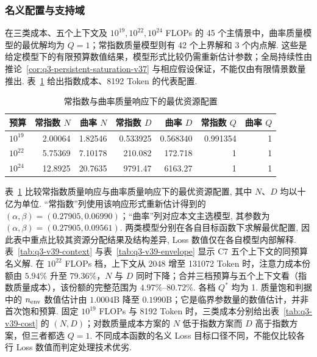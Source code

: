 \subsubsection{名义配置与支持域}
在三类成本、五个上下文及 $10^{19},10^{22},10^{24}$ FLOPs 的 45 个主情景中，曲率质量模型的最优解均为 $Q=1$；常指数质量模型则有 42 个上界解和 3 个内点解. 这些是给定模型下的有限预算数值结果，模型形式比较仍需重新估计参数；全局持续性由推论~\ref{cor:q3-persistent-saturation-v37} 与相应假设保证，不能仅由有限情景数量推出. 表~\ref{tab:q3-v26-config} 给出指数成本、8192 Token 的代表配置. 
\begin{table}[htbp]\centering\small
    \caption{常指数与曲率质量响应下的最优资源配置}\label{tab:q3-v26-config}
    \begin{tabular}{lrrrrrr}\toprule
        预算        & 常指数 $N$ & 曲率 $N$  & 常指数 $D$  & 曲率 $D$   & 常指数 $Q$  & 曲率 $Q$ \\\midrule
        $10^{19}$ & 2.00064 & 1.82546 & 0.533925 & 0.568340 & 0.991354 & 1      \\
        $10^{22}$ & 5.75369 & 7.10178 & 210.082  & 172.718  & 1        & 1      \\
        $10^{24}$ & 12.8925 & 20.7635 & 9791.47  & 6163.27  & 1        & 1      \\\bottomrule
    \end{tabular}\end{table}




表~\ref{tab:q3-v26-config} 比较常指数质量响应与曲率质量响应下的最优资源配置, 其中 $N$、$D$ 均以十亿为单位. “常指数”列使用该响应形式重新估计得到的 $(\alpha,\beta)=(0.27905,0.06990)$；“曲率”列对应本文主选模型, 其参数为 $(\alpha,\beta)=(0.27905,0.09561)$. 两类模型分别在各自目标函数下求解最优配置, 因此表中重点比较其资源分配结果及结构差异, Loss 数值仅在各自模型内部解释.
表~\ref{tab:q3-v39-context} 与表~\ref{tab:q3-v39-envelope} 显示 C7 五个上下文的同预算名义解. 在 $10^{22}$ FLOPs 档，上下文从 2048 增至 131072 Token 时，注意力成本份额由 $5.94\%$ 升至 $79.36\%$，$N$ 与 $D$ 同时下降；合并三档预算与五个上下文看（指数质量成本），该份额的完整范围为 $4.97\%$--$80.72\%$. 各档 $Q^*$ 均为 1. 质量饱和判据中的 $n_{\rm env}$ 数值估计由 $1.0004$B 降至 $0.1990$B；它是临界参数量的数值估计，并非首次饱和预算. 固定 $10^{19}$ FLOPs 与 8192 Token 时，三类成本分别给出表~\ref{tab:q3-v39-cost} 的 $(N,D)$；对数质量成本方案的 $N$ 低于指数方案而 $D$ 高于指数方案，但三者都选 $Q=1$. 不同成本函数的名义 Loss 目标口径不同，不能仅比较各行 Loss 数值而判定处理技术优劣. 

